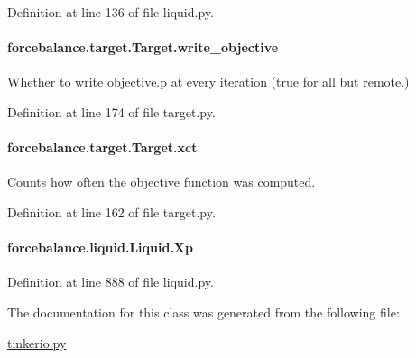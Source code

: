 Definition at line 136 of file liquid.\-py.

\hypertarget{classforcebalance_1_1target_1_1Target_a7a95624dfe03f0cee0e5f1ae09db306a}{
\paragraph[{write\-\_\-objective}]{\setlength{\rightskip}{0pt plus 5cm}forcebalance.\-target.\-Target.\-write\-\_\-objective\hspace{0.3cm}{\ttfamily [inherited]}}}\label{classforcebalance_1_1target_1_1Target_a7a95624dfe03f0cee0e5f1ae09db306a}


Whether to write objective.\-p at every iteration (true for all but remote.) 



Definition at line 174 of file target.\-py.

\hypertarget{classforcebalance_1_1target_1_1Target_aad2e385cfbf7b4a68f1c2cb41133fe82}{
\paragraph[{xct}]{\setlength{\rightskip}{0pt plus 5cm}forcebalance.\-target.\-Target.\-xct\hspace{0.3cm}{\ttfamily [inherited]}}}\label{classforcebalance_1_1target_1_1Target_aad2e385cfbf7b4a68f1c2cb41133fe82}


Counts how often the objective function was computed. 



Definition at line 162 of file target.\-py.

\hypertarget{classforcebalance_1_1liquid_1_1Liquid_a551536bc5fa6e40eeeba61619ebe072d}{
\paragraph[{Xp}]{\setlength{\rightskip}{0pt plus 5cm}forcebalance.\-liquid.\-Liquid.\-Xp\hspace{0.3cm}{\ttfamily [inherited]}}}\label{classforcebalance_1_1liquid_1_1Liquid_a551536bc5fa6e40eeeba61619ebe072d}


Definition at line 888 of file liquid.\-py.



The documentation for this class was generated from the following file\-:\begin{DoxyCompactItemize}
\item 
\hyperlink{tinkerio_8py}{tinkerio.\-py}\end{DoxyCompactItemize}
